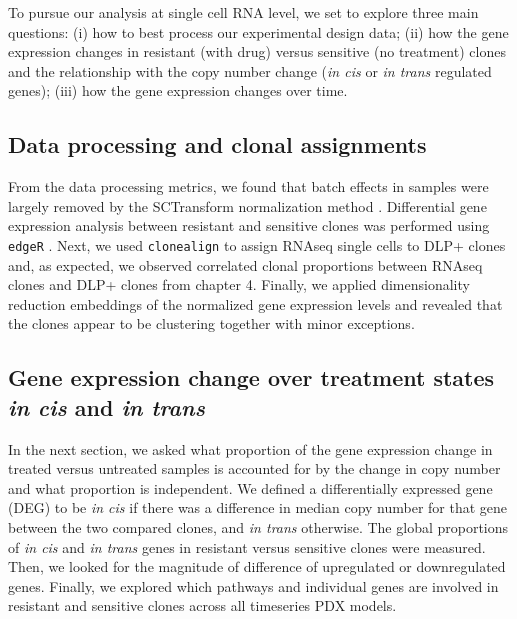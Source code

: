 To pursue our analysis at single cell RNA level, we set to explore three main questions: (i) how to best  process our experimental design data; (ii) how the gene expression changes in resistant (with drug) versus sensitive (no treatment) clones and the relationship with the copy number change (\textit{in cis} or \textit{in trans} regulated genes); (iii) how the gene expression changes over time.  

\subsection{Data processing and clonal assignments}
 From the data processing metrics, we found that batch effects in samples were largely removed by the SCTransform normalization method \cite{hafemeister2019normalization}. Differential gene expression analysis between resistant and sensitive clones was performed using \texttt{edgeR} \cite{robinson2010edger}.
Next, we used \texttt{clonealign} \cite{campbell2019clonealign} to assign RNAseq single cells to DLP+ clones and, as expected, we observed correlated clonal proportions between RNAseq clones and  DLP+ clones from chapter 4. Finally,   
we applied dimensionality reduction embeddings of the normalized gene expression levels and revealed that the clones appear to be clustering together with minor exceptions. 


\subsection{Gene expression change over treatment states \textit{in cis} and \textit{in trans}} 
In the next section, we asked what proportion of the gene expression change in treated versus untreated samples is accounted for by the change in copy number and what proportion is independent. We defined a differentially expressed gene (DEG) to be \textit{in cis} if there was a difference in median copy number for that gene between the two compared clones, and \textit{in trans} otherwise. The global proportions of \textit{in cis} and \textit{in trans} genes in resistant versus sensitive clones were measured. Then, we looked for the magnitude of difference of upregulated or downregulated genes. Finally, we explored which pathways and individual genes are involved in resistant and sensitive clones across all timeseries PDX models. 

